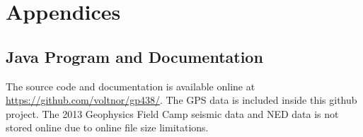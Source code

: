 \documentclass[12pt]{article}
\begin{document}
\newpage
\section{Appendices}

\subsection{Java Program and Documentation}
The source code and documentation is available online at \url{https://github.com/voltnor/gp438/}. The GPS data is included inside this github project. The 2013 Geophysics Field Camp seismic data and NED data is not stored online due to online file size limitations. 
\end{document}
